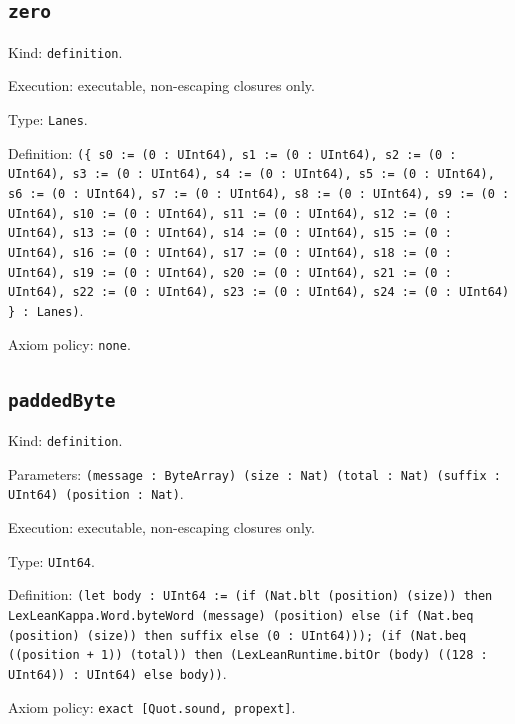 \documentclass[11pt]{article}
\begin{document}
\subsection*{\texttt{zero}}
\noindent Kind: \texttt{definition}.\par
\noindent Execution: executable, non-escaping closures only.\par
\noindent Type: \texttt{Lanes}.\par
\noindent Definition: \texttt{(\{ s0 := (0 : UInt64), s1 := (0 : UInt64), s2 := (0 : UInt64), s3 := (0 : UInt64), s4 := (0 : UInt64), s5 := (0 : UInt64), s6 := (0 : UInt64), s7 := (0 : UInt64), s8 := (0 : UInt64), s9 := (0 : UInt64), s10 := (0 : UInt64), s11 := (0 : UInt64), s12 := (0 : UInt64), s13 := (0 : UInt64), s14 := (0 : UInt64), s15 := (0 : UInt64), s16 := (0 : UInt64), s17 := (0 : UInt64), s18 := (0 : UInt64), s19 := (0 : UInt64), s20 := (0 : UInt64), s21 := (0 : UInt64), s22 := (0 : UInt64), s23 := (0 : UInt64), s24 := (0 : UInt64) \} : Lanes)}.\par
\noindent Axiom policy: \texttt{none}.\par
\subsection*{\texttt{paddedByte}}
\noindent Kind: \texttt{definition}.\par
\noindent Parameters: \texttt{(message : ByteArray) (size : Nat) (total : Nat) (suffix : UInt64) (position : Nat)}.\par
\noindent Execution: executable, non-escaping closures only.\par
\noindent Type: \texttt{UInt64}.\par
\noindent Definition: \texttt{(let body : UInt64 := (if (Nat.blt (position) (size)) then LexLeanKappa.Word.byteWord (message) (position) else (if (Nat.beq (position) (size)) then suffix else (0 : UInt64))); (if (Nat.beq ((position + 1)) (total)) then (LexLeanRuntime.bitOr (body) ((128 : UInt64)) : UInt64) else body))}.\par
\noindent Axiom policy: \texttt{exact [Quot.sound, propext]}.\par
\end{document}
